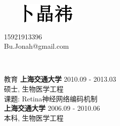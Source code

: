 \documentclass{resume} %
\begin{document}
\begin{figure}
	\centering
	\includegraphics[scale=1.2]{images/name.pdf}
\end{figure}
\vspace{-60pt}
\begin{center}
	15921913396 \quad \\ \quad Bu.Jonah@gmail.com
\end{center}

\
\begin{rSection}{教育}
{\bf 上海交通大学} \hfill {2010.09 - 2013.03} \\ 
硕士, 生物医学工程 \\
课题: Retina神经网络编码机制\\

\vspace{-10pt}
{\bf 上海交通大学} \hfill {2006.09 - 2010.06} \\ 
本科, 生物医学工程 \\

\end{rSection}
\end{document}
